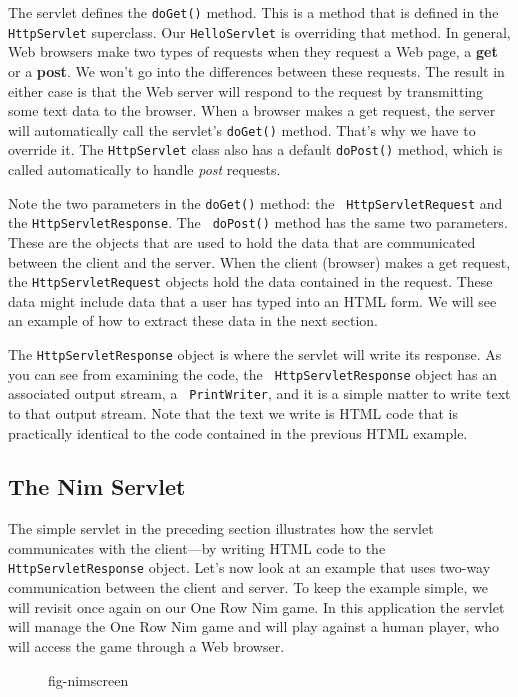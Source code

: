 The servlet defines the {\tt doGet()} method. This is a method that is
defined in the {\tt HttpServlet} superclass. Our {\tt HelloServlet} is
overriding that method.  In general, Web browsers make two types of
requests when they request a Web page, a {\bf get} or a {\bf post}.  We
won't go into the differences between these requests. The result in
either case is that the Web server will respond to the request by
transmitting some text data to the browser.  When
a browser makes a get request, the server will automatically call the
servlet's {\tt doGet()} method. That's why we have to override it.
The {\tt HttpServlet} class also has a default {\tt doPost()} method,
which is called automatically to handle {\em post} requests.

Note the two parameters in the {\tt doGet()} method: the {\tt
HttpServlet\-Request} and the {\tt HttpServletResponse}.  The {\tt
doPost()} method has the same two parameters. These are the objects
that are used to hold the data that are communicated between the
client and the server.  When the client (browser) makes a get request,
the {\tt HttpServletRequest} objects hold the data contained in
the request. These data might include data that a user has typed into
an HTML form.  We will see an example of how to extract these data
in the next section.  

The {\tt HttpServletResponse} object is where the servlet will write
its response. As you can see from examining the code, the {\tt
HttpServlet\-Response} object has an associated output stream, a {\tt
PrintWriter}, and it is a simple matter to write text to that output
stream.  Note that the text we write is HTML code that is practically
identical to the code contained in the previous HTML example.

\subsection{The Nim Servlet}

The simple servlet in the preceding section illustrates how the
servlet communicates with the client---by writing HTML code to the
{\tt HttpServlet\-Response} object.  Let's now look at an example that
uses two-way communication between the client and server. To keep the
example simple, we will revisit once again on our One Row Nim game.  In
this application the servlet will manage the One Row Nim game and will
play against a human player, who will access the game through a Web
browser.  

\begin{figure}[h!]
{fig-nimscreen}
\end{figure}

